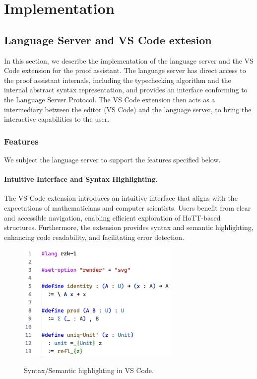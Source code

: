 \chapter{Implementation}
\label{chap:impl}

\section{\Rzk{} Language Server and VS Code extesion}

In this section, we describe the implementation of the language server
and the VS Code extension for the \Rzk{} proof assistant.
The language server has direct access to the proof assistant internals,
including the typechecking algorithm and the internal abstract syntax representation,
and provides an interface conforming to the Language Server Protocol.
The VS Code extension then acts as a intermediary between the editor (VS Code)
and the language server, to bring the interactive capabilities to the user.

\subsection{Features}


We subject the language server to support the features specified below.

\subsubsection{Intuitive Interface and Syntax Highlighting.}

The VS Code extension introduces an intuitive interface that aligns with
the expectations of mathematicians and computer scientists.
Users benefit from clear and accessible navigation,
enabling efficient exploration of HoTT-based structures.
Furthermore, the extension provides syntax and semantic highlighting,
enhancing code readability, and facilitating error detection.

\begin{figure}
  \centering
  \includegraphics[width=0.7\textwidth]{figs/syntax-highlighting.png}
  \label{figure:syntax-highlighting}
  \caption{Syntax/Semantic highlighting in VS Code.}
\end{figure}

